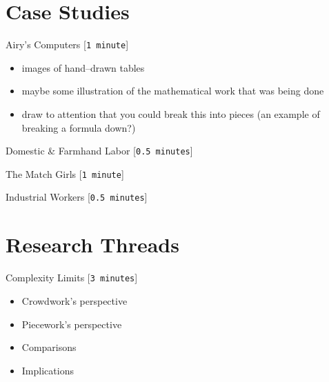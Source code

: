 \documentclass{beamer}
\begin{document}
\section{Case Studies}
\begin{frame}{Airy's Computers
                                                                                [\texttt{1 minute}]
    }
\begin{itemize}
  \item images of hand--drawn tables
  \item maybe some illustration of the mathematical work that was being done
  \item draw to attention that you could break this into pieces
        (an example of breaking a formula down?)
\end{itemize}
\end{frame}

\begin{frame}{Domestic \& Farmhand Labor
                                                                                [\texttt{0.5 minutes}]
}
\end{frame}


\begin{frame}{The Match Girls
                                                                                [\texttt{1 minute}]
}
\end{frame}


\begin{frame}{Industrial Workers
                                                                                [\texttt{0.5 minutes}]
}
\end{frame}



\section{Research Threads}
\begin{frame}{Complexity Limits
                                                                                [\texttt{3 minutes}]
}
\begin{itemize}[<+- | alert@+>]
  \item Crowdwork's perspective
  \item Piecework's perspective
  \item Comparisons
  \item Implications
\end{itemize}
\end{frame}
\end{document}
